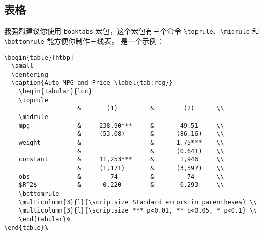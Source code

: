 \documentclass[lang=cn,11pt]{elegantpaper}
\begin{document}
\subsection{表格}
我强烈建议你使用 \lstinline{booktabs} 宏包，这个宏包有三个命令 \lstinline{\toprule}、\lstinline{\midrule} 和 \lstinline{\bottomrule} 能方便你制作三线表。 是一个示例：

\begin{lstlisting}
\begin{table}[htbp]
  \small
  \centering
  \caption{Auto MPG and Price \label{tab:reg}}
    \begin{tabular}{lcc}
    \toprule
                    &       (1)         &        (2)      \\
    \midrule
    mpg             &    -238.90***     &      -49.51     \\
                    &     (53.08)       &      (86.16)    \\
    weight          &                   &      1.75***    \\
                    &                   &      (0.641)    \\
    constant        &     11,253***     &       1,946     \\
                    &     (1,171)       &      (3,597)    \\
    obs             &        74         &         74      \\
    $R^2$           &      0.220        &       0.293     \\
    \bottomrule
    \multicolumn{3}{l}{\scriptsize Standard errors in parentheses} \\
    \multicolumn{3}{l}{\scriptsize *** p<0.01, ** p<0.05, * p<0.1} \\
    \end{tabular}%
\end{table}%
\end{lstlisting}
\end{document}
